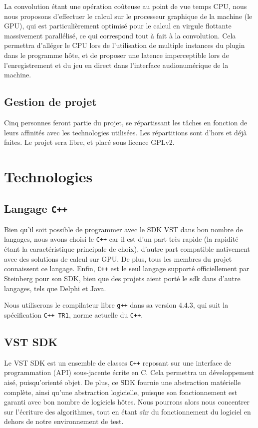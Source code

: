 La convolution étant une opération coûteuse au point de vue temps CPU, nous nous proposons d'effectuer le calcul sur le processeur graphique de la machine (le GPU), qui est particulièrement optimisé pour le calcul en virgule flottante massivement parallélisé, ce qui correspond tout à fait à la convolution. Cela permettra d'alléger le CPU lors de l'utilisation de multiple instances du plugin dans le programme hôte, et de proposer une latence imperceptible lors de l'enregistrement et du jeu en direct dans l'interface audionumérique de la machine.

\subsection{Gestion de projet}
Cinq personnes feront partie du projet, se répartissant les tâches en fonction de leurs affinités avec les technologies utilisées. Les répartitions sont d'hors et déjà faites.
Le projet sera libre, et placé sous licence GPLv2.


\section{Technologies}
\subsection{Langage {\tt C++}}
Bien qu'il soit possible de programmer avec le SDK VST dans bon nombre de langages, nous avons choisi le {\tt C++} car il est d'un part très rapide (la rapidité étant la caractéristique principale de choix), d'autre part compatible nativement avec des solutions de calcul sur GPU. De plus, tous les membres du projet connaissent ce langage. Enfin, {\tt C++} est le seul langage supporté officiellement par Steinberg pour son SDK, bien que des projets aient porté le sdk dans d'autre langages, tels que Delphi et Java.

Nous utiliserons le compilateur libre {\tt g++} dans sa version 4.4.3, qui suit la spécification {\tt C++ TR1}, norme actuelle du {\tt C++}.

\subsection{VST SDK}
Le VST SDK est un ensemble de classes {\tt C++} reposant sur une interface de programmation (API) sous-jacente écrite en C. Cela permettra un développement aisé, puisqu'orienté objet. De plus, ce SDK fournie une abstraction matérielle complète, ainsi qu'une abstraction logicielle, puisque son fonctionnement est garanti avec bon nombre de logiciels hôtes. Nous pourrons alors nous concentrer sur l'écriture des algorithmes, tout en étant sûr du fonctionnement du logiciel en dehors de notre environnement de test.

